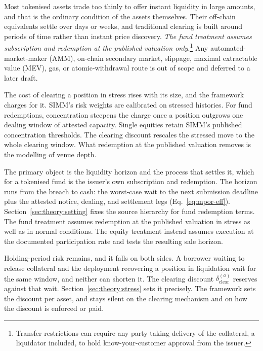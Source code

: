 Most tokenised assets trade too thinly to offer instant liquidity in large amounts, and that is the ordinary condition of the assets themselves. Their off-chain equivalents settle over days or weeks, and traditional clearing is built around periods of time rather than instant price discovery. \emph{The fund treatment assumes subscription and redemption at the published valuation only}.\footnote{Transfer restrictions can require any party taking delivery of the collateral, a liquidator included, to hold know-your-customer approval from the issuer.} Any automated-market-maker (AMM), on-chain secondary market, slippage, maximal extractable value (MEV), gas, or atomic-withdrawal route is out of scope and deferred to a later draft.

The cost of clearing a position in stress rises with its size, and the framework charges for it. SIMM's risk weights are calibrated on stressed histories. For fund redemptions, concentration steepens the charge once a position outgrows one dealing window of attested capacity. Single equities retain SIMM's published concentration thresholds. The clearing discount rescales the stressed move to the whole clearing window. What redemption at the published valuation removes is the modelling of venue depth.

The primary object is the liquidity horizon and the process that settles it, which for a tokenised fund is the issuer's own subscription and redemption. The horizon runs from the breach to cash: the worst-case wait to the next submission deadline plus the attested notice, dealing, and settlement legs (Eq.~\eqref{eq:mpor-eff}). Section~\ref{sec:theory:setting} fixes the source hierarchy for fund redemption terms. The fund treatment assumes redemption at the published valuation in stress as well as in normal conditions. The equity treatment instead assumes execution at the documented participation rate and tests the resulting sale horizon.

Holding-period risk remains, and it falls on both sides. A borrower waiting to release collateral and the deployment recovering a position in liquidation wait for the same window, and neither can shorten it. The clearing discount $\delta_{\mathrm{clear}}^{(a)}$ reserves against that wait. Section~\ref{sec:theory:stress} sets it precisely. The framework sets the discount per asset, and stays silent on the clearing mechanism and on how the discount is enforced or paid.


